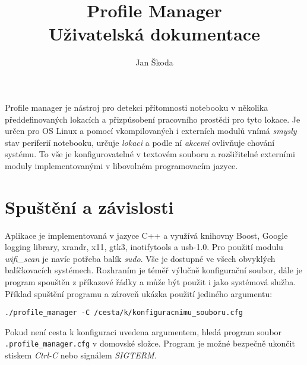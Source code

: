 \documentclass[10pt,a4paper]{article}
\author{Jan Škoda}
\title{Profile Manager \\ Uživatelská dokumentace}
\begin{document}
\maketitle

\pagestyle{empty}
Profile manager je nástroj pro detekci přítomnosti notebooku v několika předdefinovaných lokacích a přizpůsobení pracovního prostědí pro tyto lokace. Je určen pro OS Linux a pomocí vkompilovaných i externích modulů vnímá \textit{smysly} stav periferií notebooku, určuje \textit{lokaci} a podle ní \textit{akcemi} ovlivňuje chování systému. To vše je konfigurovatelné v textovém souboru a rozšiřitelné externími moduly implementovanými v libovolném programovacím jazyce.

\section*{Spuštění a závislosti}
Aplikace je implementovaná v jazyce C++ a využívá knihovny Boost, Google logging library, xrandr, x11, gtk3, inotifytools a usb-1.0. Pro použití modulu \textit{wifi\_scan} je navíc potřeba balík \textit{sudo}. Vše je dostupné ve všech obvyklých balíčkovacích systémech. Rozhraním je téměř výlučně konfigurační soubor, dále je program spouštěn z příkazové řádky a může být použit i jako systémová služba. Příklad spuštění programu a zároveň ukázka použití jediného argumentu:
\begin{verbatim}
./profile_manager -C /cesta/k/konfiguracnimu_souboru.cfg
\end{verbatim}
Pokud není cesta k konfiguraci uvedena argumentem, hledá program soubor \texttt{.profile\_manager.cfg} v domovské složce. Program je možné bezpečně ukončit stiskem \textit{Ctrl-C} nebo signálem \textit{SIGTERM}.
\end{document}
